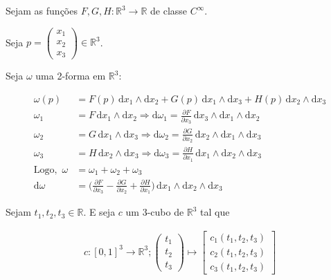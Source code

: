 \documentclass[12pt,a4paper]{article}
\begin{document}
		Sejam as fun\c{c}\~oes $F, G, H : \mathbb{R}^3 \rightarrow \mathbb{R}$ de classe $C^\infty$.

		Seja $p = \begin{pmatrix} x_1 \\ x_2 \\ x_3 \end{pmatrix} \in \mathbb{R}^3$.

		Seja $\omega$ uma 2-forma em $\mathbb{R}^3$:

		\begin{align}
			\omega(p) &= F(p) \,\mathrm{d}x_1 \wedge \mathrm{d}x_2 + G(p) \,\mathrm{d}x_1 \wedge \mathrm{d}x_3 + H(p) \,\mathrm{d}x_2 \wedge \mathrm{d}x_3 \label{DefinaOmega} \\
			\omega_1 &= F \,\mathrm{d}x_1 \wedge\mathrm{d}x_2 \Rightarrow \mathrm{d}\omega_1 = \frac{\partial F}{\partial x_3} \,\mathrm{d}x_3 \wedge\mathrm{d}x_1 \wedge\mathrm{d}x_2 \\
			\omega_2 &= G \,\mathrm{d}x_1 \wedge\mathrm{d}x_3 \Rightarrow \mathrm{d}\omega_2 = \frac{\partial G}{\partial x_2} \,\mathrm{d}x_2 \wedge\mathrm{d}x_1 \wedge\mathrm{d}x_3 \\
			\omega_3 &= H \,\mathrm{d}x_2 \wedge\mathrm{d}x_3 \Rightarrow \mathrm{d}\omega_3 = \frac{\partial H}{\partial x_1} \,\mathrm{d}x_1 \wedge\mathrm{d}x_2 \wedge\mathrm{d}x_3 \\
			\mathrm {Logo,\,\,} \omega &= \omega_1 + \omega_2 + \omega_3 \label{DecomposicaoOmega} \\
			\mathrm{d}\omega &= \biggl( \frac{\partial F}{\partial x_3} - \frac{\partial G}{\partial x_2} + \frac{\partial H}{\partial x_1} \biggl) \,\mathrm{d}x_1 \wedge\mathrm{d}x_2 \wedge\mathrm{d}x_3
		\end{align}

		Sejam $t_1, t_2, t_3 \in \mathbb{R}$. E seja $c$ um 3-cubo de $\mathbb{R}^3$ tal que

		\begin{align}
			c : [0,1]^3 \rightarrow \mathbb{R}^3 ;  \begin{pmatrix} t_1 \\ t_2 \\ t_3 \end{pmatrix} \mapsto \begin{bmatrix} c_1(t_1, t_2, t_3) \\ c_2(t_1, t_2, t_3) \\ c_3(t_1, t_2, t_3) \end{bmatrix}
		\end{align}
\end{document}
